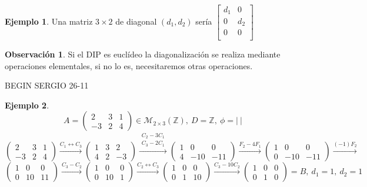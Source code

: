 \documentclass{article}
\theoremstyle{theorem-style}  %
\theoremstyle{definition}
\newtheorem*{observation}{Observación} %
\theoremstyle{example-style}
\newtheorem{example}{Ejemplo}[section]
\begin{document}
	\begin{example}
		Una matriz $3\times 2$ de diagonal $(d_1,d_2)$ sería $\begin{bmatrix}
		d_1 & 0  \\
		0   & d_2\\
		0   & 0  \\
		\end{bmatrix}$
	\end{example}
	\begin{observation}
		Si el DIP es euclídeo la diagonalización se realiza mediante operaciones elementales, si no lo es, necesitaremos otras operaciones.
	\end{observation}

	BEGIN SERGIO 26-11
	
	\begin{example}
		\[ A = \begin{pmatrix}
				2 & 3 & 1 \\
				-3 & 2 & 4
		\end{pmatrix} \in \mathcal{M}_{2\times 3}(\mathbb{Z}), \ D=\mathbb{Z}, \ \phi=|\ |\]
		\[ \begin{pmatrix}
			2 & 3 & 1 \\
			-3 & 2 & 4
		\end{pmatrix} \xrightarrow{C_1\leftrightarrow C_3} \begin{pmatrix}
			1 & 3 & 2 \\
			4 & 2 & -3
			\end{pmatrix}\xrightarrow{\substack{C_2-3C_1\\C_3-2C_1}} \begin{pmatrix}
			1 & 0 & 0 \\
			4 & -10 & -11
			\end{pmatrix}\xrightarrow{F_2-4F_1}\begin{pmatrix}
			1 & 0 & 0 \\
			0 & -10 & -11
		\end{pmatrix}
	\xrightarrow{(-1)F_2}\] 
		\[\begin{pmatrix}
			1 & 0 & 0 \\
			0 & 10 & 11
		\end{pmatrix}
		\xrightarrow{C_3-C_2} \begin{pmatrix}
			1 & 0 & 0 \\
			0 & 10 & 1
		\end{pmatrix}
		\xrightarrow{C_2\leftrightarrow C_3} \begin{pmatrix}
			1 & 0 & 0 \\
			0 & 1 & 10
		\end{pmatrix}
		\xrightarrow{C_3-10C_2}\begin{pmatrix}
			1 & 0 & 0 \\
			0 & 1 & 0
	\end{pmatrix}=B, \ d_1=1, \ d_2=1 \]


\end{example}
\end{document}
